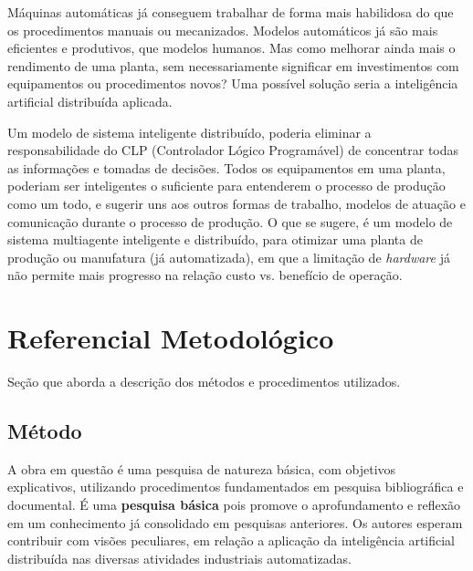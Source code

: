 \documentclass[
	article,			    %
	12pt,				    %
	oneside,			    %
	a4paper,			    %
	chapter=TITLE,		    %
	section=TITLE,		    %
	subsection=TITLE,	    %
	english,			    %
	brazil,				    %
	sumario=tradicional
]{abntex2}
\begin{document}
Máquinas automáticas já conseguem trabalhar de forma mais habilidosa do que os procedimentos manuais ou mecanizados. Modelos automáticos já são mais eficientes e produtivos, que modelos humanos. Mas como melhorar ainda mais o rendimento de uma planta, sem necessariamente significar em investimentos com equipamentos ou procedimentos novos? Uma possível solução seria a inteligência artificial distribuída aplicada. 

Um modelo de sistema inteligente distribuído, poderia eliminar a responsabilidade do CLP (Controlador Lógico Programável) de concentrar todas as informações e tomadas de decisões. Todos os equipamentos em uma planta, poderiam ser inteligentes o suficiente para entenderem o processo de produção como um todo, e sugerir uns aos outros formas de trabalho, modelos de atuação e comunicação durante o processo de produção. O que se sugere, é um modelo de sistema multiagente inteligente e distribuído, para otimizar uma planta de produção ou manufatura (já automatizada), em que a limitação de \emph{hardware} já não permite mais progresso na relação custo vs. benefício de operação.




\section{Referencial Metodológico}
Seção que aborda a descrição dos métodos e procedimentos utilizados.
\subsection{Método}
A obra em questão é uma pesquisa de natureza básica, com objetivos explicativos, utilizando procedimentos fundamentados em pesquisa bibliográfica e documental. É uma \textbf{pesquisa básica} pois promove o aprofundamento e reflexão em um conhecimento já consolidado em pesquisas anteriores. Os autores esperam contribuir com visões peculiares, em relação a aplicação da inteligência artificial distribuída nas diversas atividades industriais automatizadas.
\end{document}
